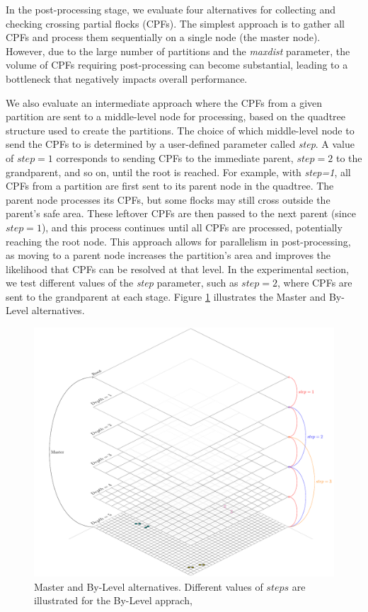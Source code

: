 In the post-processing stage, we evaluate four alternatives for collecting and checking crossing partial flocks (CPFs). The simplest approach is to gather all CPFs and process them sequentially on a single node (the master node). However, due to the large number of partitions and the \textit{maxdist} parameter, the volume of CPFs requiring post-processing can become substantial, leading to a bottleneck that negatively impacts overall performance.

We also evaluate an intermediate approach where the CPFs from a given partition are sent to a middle-level node for processing, based on the quadtree structure used to create the partitions. The choice of which middle-level node to send the CPFs to is determined by a user-defined parameter called \textit{step}. A value of $step = 1$ corresponds to sending CPFs to the immediate parent, $step = 2$ to the grandparent, and so on, until the root is reached. For example, with \textit{step=1}, all CPFs from a partition are first sent to its parent node in the quadtree. The parent node processes its CPFs, but some flocks may still cross outside the parent's safe area.  These leftover CPFs are then passed to the next parent (since $step = 1$), and this process continues until all CPFs are processed, potentially reaching the root node. This approach allows for parallelism in post-processing, as moving to a parent node increases the partition's area and improves the likelihood that CPFs can be resolved at that level. In the experimental section, we test different values of the \textit{step} parameter, such as $step=2$, where CPFs are sent to the grandparent at each stage.  Figure \ref{fig:master-bylevel_alternative} illustrates the Master and By-Level alternatives.

\begin{figure}
    \centering
    \includegraphics[width=0.75\linewidth]
    {chapterPFlocks/figures/plots/11_temporal_partitions/MasterByLevel}
    \caption{Master and By-Level alternatives.  Different values of $steps$ are illustrated for the By-Level apprach,}\label{fig:master-bylevel_alternative}
\end{figure}

